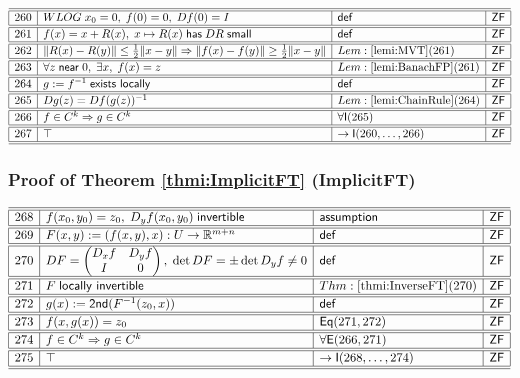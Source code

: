 \documentclass[11pt,reqno]{amsart}
\begin{document}
\noindent$%
\begin{array}{|r|l|l|l|}
\hline\hline
260 & WLOG\;x_{0}=0,\;f(0)=0,\;Df(0)=I & \mathsf{def} & \mathsf{ZF} \\ \hline\hline
261 & f(x)=x+R(x),\;x\mapsto R(x)\;\mathsf{has}\;DR\;\mathsf{small} & \mathsf{def} & \mathsf{ZF} \\ \hline\hline
262 & \|R(x)-R(y)\|\le\tfrac12\|x-y\|\Rightarrow\|f(x)-f(y)\|\ge\tfrac12\|x-y\| & Lem:\ref{lemi:MVT}(261) & \mathsf{ZF} \\ \hline\hline
263 & \forall z\;\mathsf{near}\;0,\;\exists x,\;f(x)=z & Lem:\ref{lemi:BanachFP}(261) & \mathsf{ZF} \\ \hline\hline
264 & g:=f^{-1}\;\mathsf{exists\ locally} & \mathsf{def} & \mathsf{ZF} \\ \hline\hline
265 & Dg(z)=Df(g(z))^{-1} & Lem:\ref{lemi:ChainRule}(264) & \mathsf{ZF} \\ \hline\hline
266 & f\in C^{k}\Rightarrow g\in C^{k} & \forall\mathsf{I}(265) & \mathsf{ZF} \\ \hline\hline
267 & \top & \to\mathsf{I}(260,\dots,266) & \mathsf{ZF} \\ \hline\hline
\end{array}%
$

\medskip

\subsubsection*{Proof of Theorem \ref{thmi:ImplicitFT} (\textsf{ImplicitFT})}

\noindent$%
\begin{array}{|r|l|l|l|}
\hline\hline
268 & f(x_{0},y_{0})=z_{0},\;D_{y}f(x_{0},y_{0})\;\mathsf{invertible} & \mathsf{assumption} & \mathsf{ZF} \\ \hline\hline
269 & F(x,y):=(f(x,y),x):U\to\mathbb{R}^{m+n} & \mathsf{def} & \mathsf{ZF} \\ \hline\hline
270 & DF=\begin{pmatrix}D_{x}f&D_{y}f\\I&0\end{pmatrix},\;\det DF=\pm\det D_{y}f\neq0 & \mathsf{def} & \mathsf{ZF} \\ \hline\hline
271 & F\;\mathsf{locally\ invertible} & Thm:\ref{thmi:InverseFT}(270) & \mathsf{ZF} \\ \hline\hline
272 & g(x):=\mathsf{2nd}(F^{-1}(z_{0},x)) & \mathsf{def} & \mathsf{ZF} \\ \hline\hline
273 & f(x,g(x))=z_{0} & \mathsf{Eq}(271,272) & \mathsf{ZF} \\ \hline\hline
274 & f\in C^{k}\Rightarrow g\in C^{k} & \forall\mathsf{E}(266,271) & \mathsf{ZF} \\ \hline\hline
275 & \top & \to\mathsf{I}(268,\dots,274) & \mathsf{ZF} \\ \hline\hline
\end{array}%
$
\end{document}
